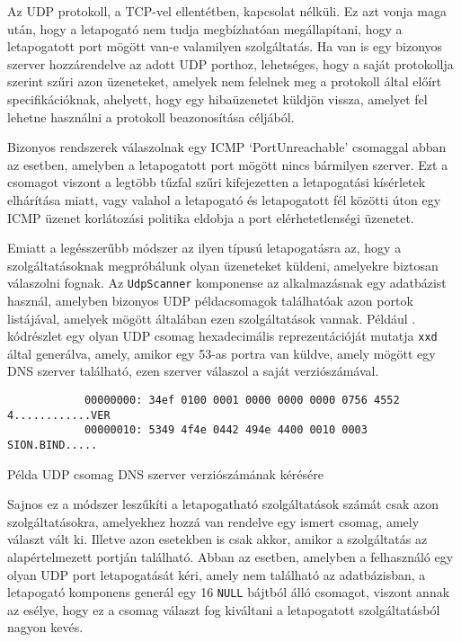 	Az UDP protokoll, a TCP-vel ellentétben, kapcsolat nélküli. Ez azt vonja maga után, hogy a letapogató nem tudja megbízhatóan megállapítani, hogy a letapogatott port mögött van-e valamilyen szolgáltatás. Ha van is egy bizonyos szerver hozzárendelve az adott UDP porthoz, lehetséges, hogy a saját protokollja szerint szűri azon üzeneteket, amelyek nem felelnek meg a protokoll által előírt specifikációknak, ahelyett, hogy egy hibaüzenetet küldjön vissza, amelyet fel lehetne használni a protokoll beazonosítása céljából.
	
	Bizonyos rendszerek válaszolnak egy ICMP `PortUnreachable' csomaggal abban az esetben, amelyben a letapogatott port mögött nincs bármilyen szerver. Ezt a csomagot viszont a legtöbb tűzfal szűri kifejezetten a letapogatási kísérletek elhárítása miatt, vagy valahol a letapogató és letapogatott fél közötti úton egy ICMP üzenet korlátozási politika eldobja a port elérhetetlenségi üzenetet.
	
	Emiatt a legésszerűbb módszer az ilyen típusú letapogatásra az, hogy a szolgáltatásoknak megpróbálunk olyan üzeneteket küldeni, amelyekre biztosan válaszolni fognak. Az \texttt{UdpScanner} komponense az alkalmazásnak egy adatbázist használ, amelyben bizonyos UDP példacsomagok találhatóak azon portok listájával, amelyek mögött általában ezen szolgáltatások vannak. Például \az{\ref{dnsverreq_hu}}. kódrészlet egy olyan UDP csomag hexadecimális reprezentációját mutatja \texttt{xxd} által generálva, amely, amikor egy 53-as portra van küldve, amely mögött egy DNS szerver található, ezen szerver válaszol a saját verziószámával.

	\begin{listing}[H]
		\begin{verbatim}
			00000000: 34ef 0100 0001 0000 0000 0000 0756 4552  4............VER
			00000010: 5349 4f4e 0442 494e 4400 0010 0003       SION.BIND.....
		\end{verbatim}
		\caption{Példa UDP csomag DNS szerver verziószámának kérésére}
		\label{dnsverreq_hu}
	\end{listing}
	
	Sajnos ez a módszer leszűkíti a letapogatható szolgáltatások számát csak azon szolgáltatásokra, amelyekhez hozzá van rendelve egy ismert csomag, amely választ vált ki. Illetve azon esetekben is csak akkor, amikor a szolgáltatás az alapértelmezett portján található. Abban az esetben, amelyben a felhasználó egy olyan UDP port letapogatását kéri, amely nem található az adatbázisban, a letapogató komponens generál egy 16 \texttt{NULL} bájtból álló csomagot, viszont annak az esélye, hogy ez a csomag választ fog kiváltani a letapogatott szolgáltatásból nagyon kevés.
	
